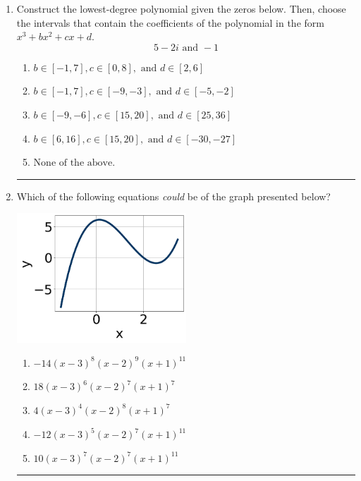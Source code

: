 \documentclass[14pt]{extbook}
\newcommand{\litem}[1]{\item#1\hspace*{-1cm}\rule{\textwidth}{0.4pt}}
\begin{document}
\begin{enumerate}
{\begin{enumerate}[label=\Alph*.]
\end{enumerate} }
\litem{
Construct the lowest-degree polynomial given the zeros below. Then, choose the intervals that contain the coefficients of the polynomial in the form $x^3+bx^2+cx+d$.\[ 5 - 2 i \text{ and } -1 \]\begin{enumerate}[label=\Alph*.]
\item \( b \in [-1, 7], c \in [0, 8], \text{ and } d \in [2, 6] \)
\item \( b \in [-1, 7], c \in [-9, -3], \text{ and } d \in [-5, -2] \)
\item \( b \in [-9, -6], c \in [15, 20], \text{ and } d \in [25, 36] \)
\item \( b \in [6, 16], c \in [15, 20], \text{ and } d \in [-30, -27] \)
\item \( \text{None of the above.} \)

\end{enumerate} }
\litem{
Which of the following equations \textit{could} be of the graph presented below?
\begin{center}
    \includegraphics[width=0.5\textwidth]{../Figures/polyGraphToFunctionCopyA.png}
\end{center}
\begin{enumerate}[label=\Alph*.]
\item \( -14(x - 3)^{8} (x - 2)^{9} (x + 1)^{11} \)
\item \( 18(x - 3)^{6} (x - 2)^{7} (x + 1)^{7} \)
\item \( 4(x - 3)^{4} (x - 2)^{8} (x + 1)^{7} \)
\item \( -12(x - 3)^{5} (x - 2)^{7} (x + 1)^{11} \)
\item \( 10(x - 3)^{7} (x - 2)^{7} (x + 1)^{11} \)


\end{enumerate}}
\end{enumerate}
\end{document}
